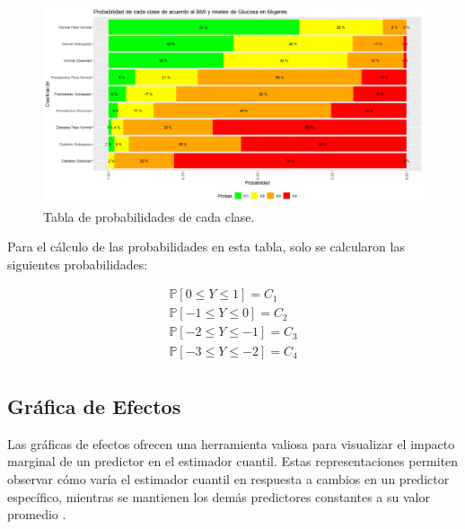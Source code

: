 \begin{figure}[H]
    \centering
    \includegraphics[height = 12 cm, width = 0.98 \textwidth]{4img/tablaM.png}
    \caption{Tabla de probabilidades de cada clase.}
    \label{fig:ejemploTabla}
\end{figure}

Para el cálculo de las probabilidades en esta tabla, solo se calcularon las siguientes probabilidades:

\begin{equation}
     \begin{matrix}
\mathbb{P}[0 \leq Y \leq 1] = C_1 \\
\mathbb{P}[-1 \leq Y \leq 0] = C_2  \\
\mathbb{P}[-2 \leq Y \leq -1] = C_3 \\
\mathbb{P}[-3 \leq Y \leq -2] = C_4 \\
\end{matrix}
\end{equation}

\subsection{Gráfica de Efectos}

Las gráficas de efectos ofrecen una herramienta valiosa para visualizar el impacto marginal de un predictor en el estimador cuantil. Estas representaciones permiten observar cómo varía el estimador cuantil en respuesta a cambios en un predictor específico, mientras se mantienen los demás predictores constantes a su valor promedio \cite{Tepegjozova2022}.

